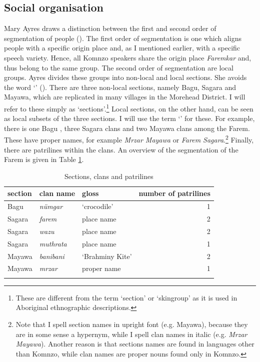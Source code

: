 \subsection{Social organisation}\label{segmentationofpeople}

Mary Ayres draws a distinction between the first and second order of segmentation of people (\citeyear[126]{Ayres:ws}). The first order of segmentation is one which aligns people with a specific origin place and, as I mentioned earlier, with a specific speech variety. Hence, all Komnzo speakers share the origin place \emph{Faremkar} and, thus belong to the same group. The second order of segmentation are local groups. Ayres divides these groups into non-local and local sections. She avoids the word `' (\citeyear[142]{Ayres:ws}). There are three non-local sections, namely Bagu, Sagara and Mayawa, which are replicated in many villages in the Morehead District. I will refer to these simply as `sections'.\footnote{These are different from the term `section' or `skingroup' as it is used in Aboriginal ethnographic descriptions.} Local sections, on the other hand, can be seen as local subsets of the three sections. I will use the term `' for these. For example, there is one Bagu , three Sagara clans and two Mayawa clans among the Farem. These have proper names, for example \emph{Mrzar Mayawa} or \emph{Farem Sagara}.\footnote{Note that I spell section names in upright font (e.g. Mayawa), because they are in some sense a hypernym, while I spell clan names in italic (e.g. \emph{Mrzar Mayawa}). Another reason is that sections names are found in languages other than Komnzo, while clan names are proper nouns found only in Komnzo.} Finally, there are patrilines within the clans. An overview of the segmentation of the Farem is given in Table \ref{peopleseg}.

\begin{table}
\caption{Sections, clans and patrilines}
\label{peopleseg}
	\begin{tabularx}{\textwidth}{XXXr}
		\lsptoprule
			 {section} 			&  {clan name} 	&  {gloss} 	&  {number of patrilines}\\
			 \midrule
			Bagu						& \emph{nümgar} 		& `crocodile' 		& 1\\
			Sagara						& \emph{farem} 			& place name 		& 2\\
			Sagara						& \emph{wazu} 			& place name 		& 2\\
			Sagara						& \emph{muthrata} 		& place name 		& 1\\
			Mayawa 						& \emph{banibani} 		& `Brahminy Kite'	& 2\\
			Mayawa						& \emph{mrzar} 			& proper name 		& 1\\
		\lspbottomrule
	\end{tabularx}
\end{table}

